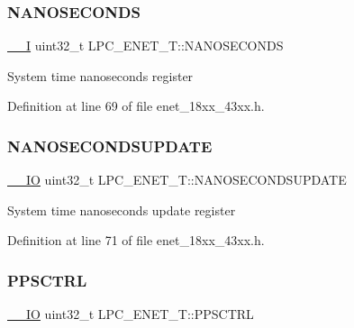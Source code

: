 \subsubsection{\texorpdfstring{N\+A\+N\+O\+S\+E\+C\+O\+N\+DS}{NANOSECONDS}}
{\footnotesize\ttfamily \hyperlink{core__sc300_8h_af63697ed9952cc71e1225efe205f6cd3}{\+\_\+\+\_\+I} uint32\+\_\+t L\+P\+C\+\_\+\+E\+N\+E\+T\+\_\+\+T\+::\+N\+A\+N\+O\+S\+E\+C\+O\+N\+DS}

System time nanoseconds register 

Definition at line 69 of file enet\+\_\+18xx\+\_\+43xx.\+h.

\mbox{\label{struct_l_p_c___e_n_e_t___t_a1521ff2c6e7dfe97cf8159eaa5d3f103}} 
\subsubsection{\texorpdfstring{N\+A\+N\+O\+S\+E\+C\+O\+N\+D\+S\+U\+P\+D\+A\+TE}{NANOSECONDSUPDATE}}
{\footnotesize\ttfamily \hyperlink{core__sc300_8h_aec43007d9998a0a0e01faede4133d6be}{\+\_\+\+\_\+\+IO} uint32\+\_\+t L\+P\+C\+\_\+\+E\+N\+E\+T\+\_\+\+T\+::\+N\+A\+N\+O\+S\+E\+C\+O\+N\+D\+S\+U\+P\+D\+A\+TE}

System time nanoseconds update register 

Definition at line 71 of file enet\+\_\+18xx\+\_\+43xx.\+h.

\mbox{\label{struct_l_p_c___e_n_e_t___t_abe830099183c82e16da56a048a2f9ac2}} 
\subsubsection{\texorpdfstring{P\+P\+S\+C\+T\+RL}{PPSCTRL}}
{\footnotesize\ttfamily \hyperlink{core__sc300_8h_aec43007d9998a0a0e01faede4133d6be}{\+\_\+\+\_\+\+IO} uint32\+\_\+t L\+P\+C\+\_\+\+E\+N\+E\+T\+\_\+\+T\+::\+P\+P\+S\+C\+T\+RL}


